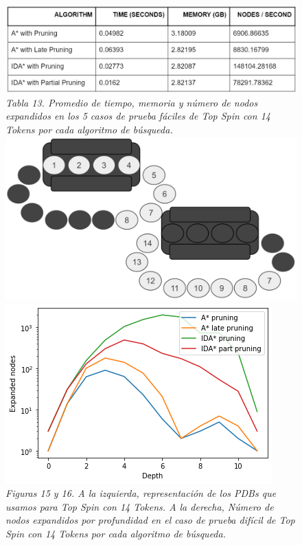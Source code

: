 \documentclass[a4paper,10pt]{article}
\begin{document}
    \begin{figure}[t!]
      \centering
      \includegraphics[scale=0.3]{topspin14T/14ts_tabla_prom.jpg} \\
      \textit{\small{Tabla 13. Promedio de tiempo, 
      memoria y n\'umero de nodos expandidos en los 5 casos de prueba
      f\'aciles de Top Spin con 14 Tokens por cada algoritmo de b\'usqueda.}}\\
      \includegraphics[scale=0.2]{topspin14T/pdb.png}
      \includegraphics[scale=0.4]{topspin14T/topspin14.png} \\
      \small{\textit{Figuras 15 y 16. A la izquierda, representaci\'on de los
      PDBs que usamos para Top Spin con 14 Tokens. A la derecha, N\'umero 
      de nodos expandidos por profundidad en el caso de prueba dif\'icil de
      Top Spin con 14 Tokens por cada algoritmo de b\'usqueda.}}
    \end{figure}
    
\end{document}
